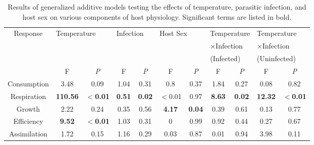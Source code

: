 \begin{landscape}

{\small
\begin{table} [H]
\caption [Results of generalized additive models testing the effects of temperature, parasitic infection, and host sex on host physiology.]{Results of generalized additive models testing the effects of temperature, parasitic infection, and host sex on various components of host physiology. Significant terms are listed in bold.}
\centering
\begin{tabular}{ c  c  c  c  c  c  c  c  c  c  c  } \toprule
Response  & \multicolumn{2}{l}{Temperature} & \multicolumn{2}{l}{Infection} & \multicolumn{2}{l}{Host Sex} & \multicolumn{2}{l}{Temperature} & \multicolumn{2}{l}{Temperature} \\
                  &            &                    &               &               &                    &         & \multicolumn{2}{l}{$\times$Infection}     & \multicolumn{2}{l}{$\times$Infection}   \\ 
                  &            &                    &               &               &                    &         & \multicolumn{2}{l}{(Infected)}     & \multicolumn{2}{l}{(Uninfected)}   \\ \midrule
                  & F           & \emph{P}                & F              & \emph{P}             & F                  & \emph{P}        & F                & \emph{P}               & F           & \emph{P}                     \\
Consumption       & 3.48       & 0.09               & 1.04          & 0.31          & 0.8                & 0.37    & 1.84             & 0.27            & 0.08        & 0.82                 \\
Respiration       & \textbf{110.56}     &\textbf{$<$0.01}     & \textbf{0.51}          & \textbf{0.02}        & $<$0.01    & 0.97    & \textbf{8.63}             & \textbf{0.02}            & \textbf{12.32}       & \textbf{$<$0.01}    \\
Growth            & 2.22       & 0.24               & 0.35          & 0.56          & \textbf{4.17}               &\textbf{0.04}    & 0.39             & 0.61            & 0.13        & 0.77                 \\
Efficiency        & \textbf{9.52}       & \textbf{$<$0.01}     & 1.03          & 0.31          & 0                  & 0.99    & 0.92             & 0.44            & 0.27        & 0.67                 \\
Assimilation      & 1.72       & 0.15               & 1.16          & 0.29          & 0.03               & 0.87    & 0.01             & 0.94            & 3.98        & 0.11          \\ \bottomrule     
\end{tabular}
\label{tab:physiot}
\end{table}
}
\end{landscape}

